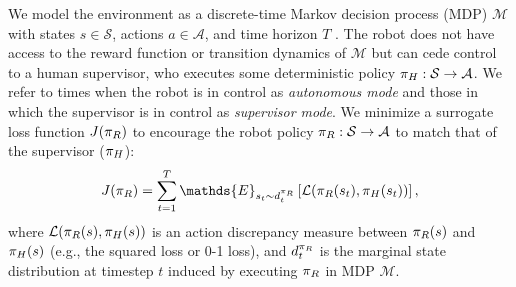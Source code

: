 We model the environment as a discrete-time Markov decision process (MDP) $\mathcal{M}$ with states $s \in \mathcal{S}$, actions $a \in \mathcal{A}$, and time horizon $T$ \cite{puterman2014markov}. The robot does not have access to the reward function or transition dynamics of $\mathcal{M}$ but can cede control to a human supervisor, who executes some deterministic policy $\pi_{H}: \mathcal{S} \to \mathcal{A}$. We refer to times when the robot is in control as \textit{autonomous mode} and those in which the supervisor is in control as \textit{supervisor mode}. 
We minimize a surrogate loss function $J(\pi_{R})$ to encourage the robot policy $\pi_{R}: \mathcal{S} \to \mathcal{A}$ to match that of the supervisor ($\pi_{H}$):
\begin{align}
    \label{eq:IL-objective}
    J(\pirob) = \sum_{t=1}^{T} \mathds{E}_{s_t \sim d^{\pirob}_t} \left[\mathcal{L}(\pirob(s_t),\pisup(s_t))\right],
\end{align}
where $\mathcal{L}(\pi_{R}(s),\pi_{H}(s))$ is an action discrepancy measure between $\pi_{R}(s)$ and $\pi_{H}(s)$ (e.g., the squared loss or 0-1 loss), and $d^{\pi_{R}}_t$ is the marginal state distribution at timestep $t$ induced by executing $\pi_{R}$ in MDP $\mathcal{M}$.

